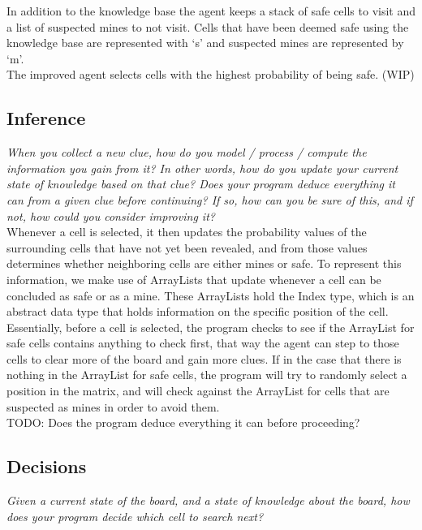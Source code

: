 \documentclass[11pt]{article} %
\begin{document}
In addition to the knowledge base the agent keeps a stack of safe cells to visit and a list of suspected mines to not visit. Cells that have been deemed safe using the knowledge base are represented with ‘s’ and suspected mines are represented by ‘m’.\\

The improved agent selects cells with the highest probability of being safe. (WIP)

\subsection{Inference}

\textit{When you collect a new clue, how do you model / process / compute the information you gain from it? In other words, how do you update your current state of knowledge based on that clue? Does your program deduce everything it can from a given clue before continuing? If so, how can you be sure of this, and if not, how could you consider improving it?}\\

Whenever a cell is selected, it then updates the probability values of the surrounding cells that have not yet been revealed, and from those values determines whether neighboring cells are either mines or safe. To represent this information, we make use of ArrayLists that update whenever a cell can be concluded as safe or as a mine. These ArrayLists hold the Index type, which is an abstract data type that holds information on the specific position of the cell. Essentially, before a cell is selected, the program checks to see if the ArrayList for safe cells contains anything to check first, that way the agent can step to those cells to clear more of the board and gain more clues. If in the case that there is nothing in the ArrayList for safe cells, the program will try to randomly select a position in the matrix, and will check against the ArrayList for cells that are suspected as mines in order to avoid them.\\

TODO: Does the program deduce everything it can before proceeding?

\subsection{Decisions}

\textit{Given a current state of the board, and a state of knowledge about the board, how does your program decide which cell to search next?}\\
\end{document}
